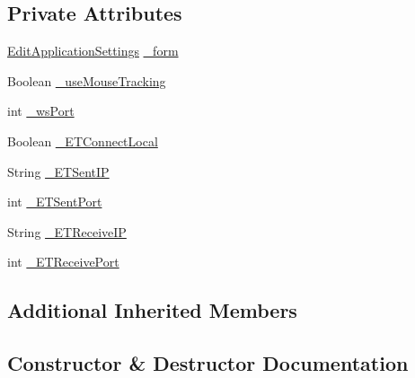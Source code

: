 \subsection*{Private Attributes}
\begin{DoxyCompactItemize}
\item 
\hyperlink{class_web_analyzer_1_1_u_i_1_1_edit_application_settings}{Edit\+Application\+Settings} \hyperlink{class_web_analyzer_1_1_u_i_1_1_interaction_objects_1_1_application_settings_obj_a6b08a377c6dc1e9f0e32d0c786012756}{\+\_\+form}
\item 
Boolean \hyperlink{class_web_analyzer_1_1_u_i_1_1_interaction_objects_1_1_application_settings_obj_a91a38f0e61ad09629d88131e49888523}{\+\_\+use\+Mouse\+Tracking}
\item 
int \hyperlink{class_web_analyzer_1_1_u_i_1_1_interaction_objects_1_1_application_settings_obj_aa8f8de8781d5d9fb22fa8b1d35ccf731}{\+\_\+ws\+Port}
\item 
Boolean \hyperlink{class_web_analyzer_1_1_u_i_1_1_interaction_objects_1_1_application_settings_obj_aa7925653fa500c2ca2eeba8196660b30}{\+\_\+\+E\+T\+Connect\+Local}
\item 
String \hyperlink{class_web_analyzer_1_1_u_i_1_1_interaction_objects_1_1_application_settings_obj_a523492d96f79d39503cb98640c567169}{\+\_\+\+E\+T\+Sent\+I\+P}
\item 
int \hyperlink{class_web_analyzer_1_1_u_i_1_1_interaction_objects_1_1_application_settings_obj_a8101f556b9e66c46b27ade6cb57bdddd}{\+\_\+\+E\+T\+Sent\+Port}
\item 
String \hyperlink{class_web_analyzer_1_1_u_i_1_1_interaction_objects_1_1_application_settings_obj_a0c3a4992e4a62a97fc4623d379dfb7fb}{\+\_\+\+E\+T\+Receive\+I\+P}
\item 
int \hyperlink{class_web_analyzer_1_1_u_i_1_1_interaction_objects_1_1_application_settings_obj_af713c0586e6436616248aa95beac0c1c}{\+\_\+\+E\+T\+Receive\+Port}
\end{DoxyCompactItemize}
\subsection*{Additional Inherited Members}


\subsection{Constructor \& Destructor Documentation}
\hypertarget{class_web_analyzer_1_1_u_i_1_1_interaction_objects_1_1_application_settings_obj_a0642bb10f6b638fd83af16a36717a1b4}{}
